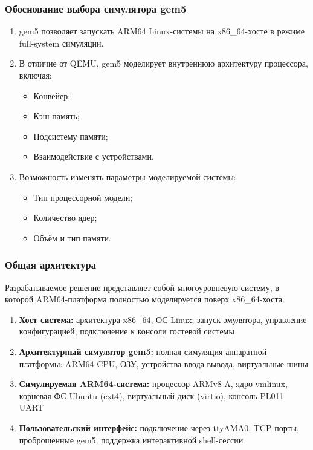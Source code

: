 \documentclass{beamer}
\begin{document}
\begin{frame}
\frametitle{Обоснование выбора симулятора gem5}
\begin{enumerate}
    \item gem5 позволяет запускать ARM64 Linux-системы на x86\_64-хосте в режиме full-system симуляции.
    \item В отличие от QEMU, gem5 моделирует внутреннюю архитектуру процессора, включая:
    \begin{itemize}
        \item Конвейер;
        \item Кэш-память;
        \item Подсистему памяти;
        \item Взаимодействие с устройствами.
    \end{itemize}
    \item Возможность изменять параметры моделируемой системы:
    \begin{itemize}
        \item Тип процессорной модели;
        \item Количество ядер;
        \item Объём и тип памяти.
    \end{itemize}
\end{enumerate}
\end{frame}

\begin{frame}
\frametitle{Общая архитектура}
Разрабатываемое решение представляет собой многоуровневую систему, в которой ARM64-платформа полностью моделируется поверх x86\_64-хоста.
\begin{enumerate}
    \item \textbf{Хост система:} архитектура x86\_64, ОС Linux; запуск эмулятора, управление конфигурацией, подключение к консоли гостевой системы
    \item \textbf{Архитектурный симулятор gem5:} полная симуляция аппаратной платформы: ARM64 CPU, ОЗУ, устройства ввода-вывода, виртуальные шины
    \item \textbf{Симулируемая ARM64-система:} процессор ARMv8-A, ядро vmlinux, корневая ФС Ubuntu (ext4), виртуальный диск (virtio), консоль PL011 UART
    \item \textbf{Пользовательский интерфейс:} подключение через ttyAMA0, TCP-порты, проброшенные gem5, поддержка интерактивной shell-сессии
\end{enumerate}
\end{frame}
\end{document}
